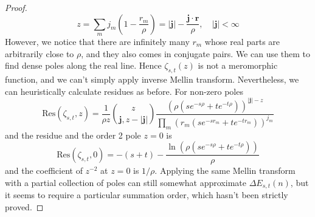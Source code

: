 \documentclass[]{article}
\begin{document}
\begin{proof}
\[
z = \sum_m j_m \left(1 - \frac{r_m}{\rho}\right) =  |\mathbf{j}| - \frac{\mathbf{j}\cdot\mathbf{r}}{\rho},\quad |\mathbf{j}| < \infty
\]
However, we notice that there are infinitely many $r_m$ whose real parts are arbitrarily close to $\rho$, and they also comes in conjugate pairs. We can use them to find dense poles along the real line. Hence $\zeta_{s,t}(z)$ is not a meromorphic function, and we can't simply apply inverse Mellin transform. Nevertheless, we can heuristically calculate residues as before. For non-zero poles
\[
\mathrm{Res}(\zeta_{s,t}, z) = \frac{1}{\rho z}{z\choose \mathbf{j}, z-|\mathbf{j}|}  \frac{\left(\rho(s e^{-s\rho} + t e^{-t\rho})\right)^{|\mathbf{j}|-z}}{\prod_m\left(r_m(s e^{-sr_m} + t e^{-tr_m})\right)^{j_m}}
\]
and the residue and the order 2 pole $z=0$ is
\[
\mathrm{Res}(\zeta_{s,t}, 0) = -(s+t) - \frac{\ln\left(\rho  (se^{-s\rho} + te^{-t\rho})\right)}{\rho}
\]
and the coefficient of $z^{-2}$ at $z = 0$ is $1/\rho$. Applying the same Mellin transform with a partial collection of poles can still somewhat approximate $\Delta E_{s,t}(n)$, but it seems to require a particular summation order, which hasn't been strictly proved.

\end{proof}
\end{document}
